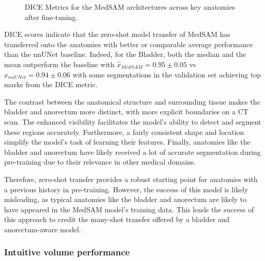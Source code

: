 \documentclass[11pt,twoside]{report}
\begin{document}
\begin{figure}
  \centering
  \vspace*{1em}
  \caption{DICE Metrics for the MedSAM architectures across key anatomies after fine-tuning.}\label{fig:medsam-finetune-dice}
\end{figure}

DICE scores indicate that the zero-shot model transfer of MedSAM has transferred onto the anatomies with better or comparable average performance than the nnUNet baseline. Indeed, for the Bladder, both the median and the mean outperform the baseline with $\hat{x}_{MedSAM} = 0.95 \pm 0.05$ vs $\hat{x}_{nnUNet} = 0.94 \pm 0.06$ with some segmentations in the validation set achieving top marks from the DICE metric. 

The contrast between the anatomical structure and surrounding tissue makes the bladder and anorectum more distinct, with more explicit boundaries on a CT scan. The enhanced visibility facilitates the model's ability to detect and segment these regions accurately. Furthermore, a fairly consistent shape and location simplify the model's task of learning their features. Finally, anatomies like the bladder and anorectum have likely received a lot of accurate segmentation during pre-training due to their relevance in other medical domains.

Therefore, zero-shot transfer provides a robust starting point for anatomies with a previous history in pre-training. However, the success of this model is likely misleading, as typical anatomies like the bladder and anorectum are likely to have appeared in the MedSAM model's training data. This lends the success of this approach to credit the many-shot transfer offered by a bladder and anorectum-aware model.

\subsubsection{Intuitive volume performance}
\end{document}
